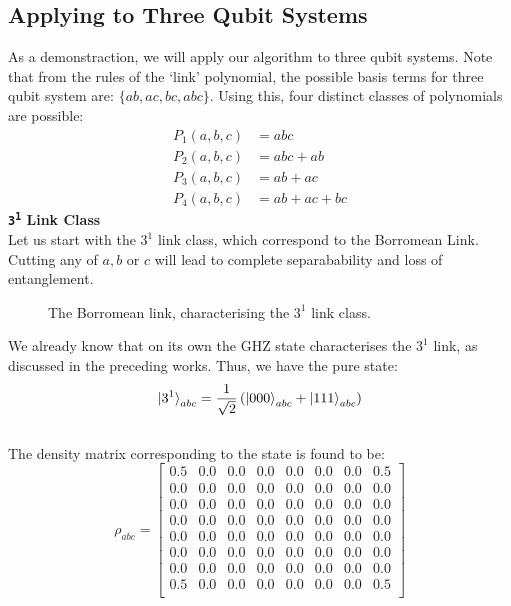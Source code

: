 \documentclass{scrartcl}
\begin{document}
\subsection{Applying to Three Qubit Systems}
As a demonstraction, we will apply our algorithm to three qubit systems. Note that from the rules of the `link' polynomial, the possible basis terms for three qubit system are: $\{ab,ac,bc, abc\}$. Using this, four distinct classes of polynomials are possible:
\begin{align*}
    P_1(a,b,c) &= abc \\
    P_2(a,b,c) &= abc+ab \\
    P_3(a,b,c) &= ab+ac \\
    P_4(a,b,c) &= ab+ac+bc
\end{align*}
\textbf{\large \texttt{3\textsuperscript{1}} Link Class} \\[0.3cm]
Let us start with the $3^1$ link class, which correspond to the Borromean Link. Cutting any of $a,b$ or $c$ will lead to complete separabability and loss of entanglement. 
\begin{figure}[H]
    \centering
    
  \caption{The Borromean link, characterising the $3^1$ link class.}
\end{figure}
\noindent
We already know that on its own the GHZ state characterises the $3^1$ link, as discussed in the preceding works. Thus, we have the pure state:
$$\ket{3^1}_{abc} = \frac{1}{\sqrt{2}}\left( \ket{000}_{abc}+\ket{111}_{abc} \right)$$\\[0.3cm]
The density matrix corresponding to the state is found to be:
\begin{equation}
    \rho_{abc} =
    \left[
    \begin{array}{cccccccc}
    0.5 & 0.0 & 0.0 & 0.0 & 0.0 & 0.0 & 0.0 & 0.5 \\
    0.0 & 0.0 & 0.0 & 0.0 & 0.0 & 0.0 & 0.0 & 0.0 \\
    0.0 & 0.0 & 0.0 & 0.0 & 0.0 & 0.0 & 0.0 & 0.0 \\
    0.0 & 0.0 & 0.0 & 0.0 & 0.0 & 0.0 & 0.0 & 0.0 \\
    0.0 & 0.0 & 0.0 & 0.0 & 0.0 & 0.0 & 0.0 & 0.0 \\
    0.0 & 0.0 & 0.0 & 0.0 & 0.0 & 0.0 & 0.0 & 0.0 \\
    0.0 & 0.0 & 0.0 & 0.0 & 0.0 & 0.0 & 0.0 & 0.0 \\
    0.5 & 0.0 & 0.0 & 0.0 & 0.0 & 0.0 & 0.0 & 0.5 \\
    \end{array}
    \right]
    \end{equation}
\end{document}
